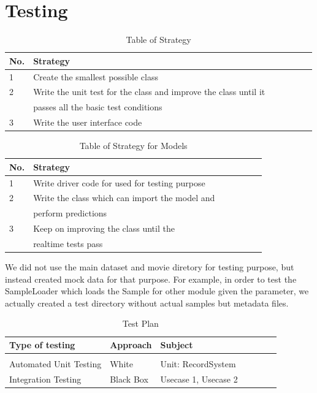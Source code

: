 \documentclass[12pt,a4paper,man]{report}
\begin{document}
\section{Testing}
\label{sec:orgdd0284c}


\begin{table}[htbp]
\caption{\label{table:strattable}
Table of Strategy}
\centering
\begin{tabular}{|l|l|l|l|l|lp{3cm}|}
\hline
\textbf{No.} & \textbf{Strategy}\\
\hline
1 & Create the smallest possible class\\
\hline
2 & Write the unit test for the class    and improve the class until it\\
 & passes all the basic test conditions\\
\hline
3 & Write the user interface code\\
\hline
\end{tabular}
\end{table}


\begin{table}[htbp]
\caption{\label{table:mstrattable}
Table of Strategy for Models}
\centering
\begin{tabular}{|l|l|l|l|l|lp{3cm}|}
\hline
\textbf{No.} & \textbf{Strategy}\\
\hline
1 & Write driver code for used for testing purpose\\
\hline
2 & Write the class which can import the model and\\
 & perform predictions\\
\hline
3 & Keep on improving the class until the\\
 & realtime tests pass\\
\hline
\end{tabular}
\end{table}

We did not use the main dataset and movie diretory for testing purpose, but instead created mock data for that purpose. For example, in order to test the SampleLoader which loads the Sample for other module given the parameter, we actually created a test directory without actual samples but metadata files. 

\begin{table}[htbp]
\caption{\label{table:testtable}
Test Plan}
\centering
\begin{tabular}{|l|l|l|l|l|lp{3cm}|}
\hline
\textbf{Type of testing} & \textbf{Approach} & \textbf{Subject}\\
\hline
 &  & \\
Automated Unit Testing & White & Unit: RecordSystem\\
Integration Testing & Black Box & Usecase 1, Usecase 2\\
\hline
\end{tabular}
\end{table}
\end{document}
